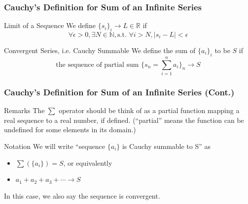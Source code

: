 \documentclass{beamer}
\begin{document}
\begin{frame}
\frametitle{Cauchy's Definition for Sum of an Infinite Series}

\begin{block}{Limit of a Sequence}
We define $ \{s_i\}_i \rightarrow L \in \mathbb{R} $ if \\ 
$$ \forall \epsilon > 0, \exists N \in \mathbb{N}, \text{s.t. } \forall i > N,  |s_i - L| < \epsilon $$
\end{block}

\begin{block}{Convergent Series, i.e. Cauchy Summable}
We define the sum of $ \{a_i\}_i $ to be $S$ if \\ 
$$ \text{the sequence of partial sum } \bigg\{s_n = \sum_{i=1}^{n} a_i \bigg\}_n \rightarrow S $$
\end{block}

\end{frame}


\begin{frame}
\frametitle{Cauchy's Definition for Sum of an Infinite Series (Cont.)}

\begin{block}{Remarks}
The $\sum$ operator should be think of as a partial function mapping a real sequence to a real number, if defined. (``partial'' means the function can be undefined for some elements in its domain.)  
\end{block}

\begin{block}{Notation}
We will write ``sequence $ \{a_i\} $ is Cauchy summable to S'' as 
\begin{itemize}
    \item $ \sum (\{a_i\}) = S $, or equivalently 
    \item $ a_1 + a_2 + a_3 + \cdots \longrightarrow S $
\end{itemize}
In this case, we also say the sequence is \alert{convergent}. 
\end{block}

\end{frame}

\end{document}
